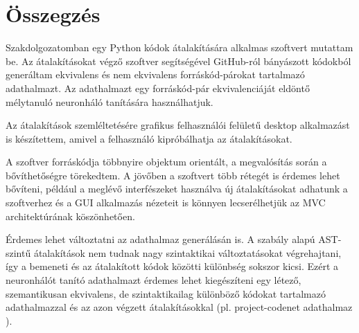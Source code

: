 \chapter{Összegzés}
\label{ch:sum}

Szakdolgozatomban egy Python kódok átalakítására alkalmas szoftvert mutattam be.
Az átalakításokat végző szoftver segítségével GitHub-ról bányászott kódokból generáltam
ekvivalens és nem ekvivalens forráskód-párokat tartalmazó adathalmazt.
Az adathalmazt egy forráskód-pár ekvivalenciáját eldöntő mélytanuló neuronháló tanítására használhatjuk.

Az átalakítások szemléltetésére grafikus felhasználói felületű desktop alkalmazást is készítettem,
amivel a felhasználó kipróbálhatja az átalakításokat.

A szoftver forráskódja többnyire objektum orientált,
a megvalósítás során a bővíthetőségre törekedtem.
A jövőben a szoftvert több rétegét is érdemes lehet bővíteni,
például a meglévő interfészeket használva új átalakításokat adhatunk a szoftverhez és
a GUI alkalmazás nézeteit is könnyen lecserélhetjük az MVC architektúrának köszönhetően.

Érdemes lehet változtatni az adathalmaz generálásán is. 
A szabály alapú AST-szintű átalakítások nem tudnak nagy szintaktikai változtatásokat végrehajtani,
így a bemeneti és az átalakított kódok közötti különbség sokszor kicsi.
Ezért a neuronhálót tanító adathalmazt érdemes lehet kiegészíteni egy létező,
szemantikusan ekvivalens, de szintaktikailag különböző kódokat 
tartalmazó adathalmazzal és az azon végzett átalakításokkal
(pl. project-codenet adathalmaz \cite{puri2021codenet}).
